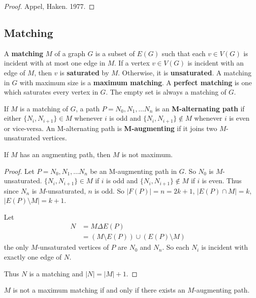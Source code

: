 \documentclass[12pt]{article}
\begin{document}
\begin{proof}
Appel, Haken. 1977.
\end{proof}

\subsection{Matching}
A {\bf matching} $M$ of a graph $G$ is a subset of $E(G)$ such that each $v\in V(G)$ is incident with at most one edge in $M$. If a vertex $v\in V(G)$ is incident with an edge of $M$, then $v$ is {\bf saturated} by $M$. Otherwise, it is {\bf unsaturated}. A matching in $G$ with maximum size is a {\bf maximum matching}. A {\bf perfect matching} is one which saturates every vertex in $G$. The empty set is always a matching of $G$.

If $M$ is a matching of $G$, a path $P = N_0, N_1, \dots N_n$ is an {\bf M-alternating path} if either $\{ N_i, N_{i+1} \} \in M$ whenever $i$ is odd and $\{ N_i, N_{i+1} \} \notin M$ whenever $i$ is even or vice-versa. An M-alternating path is {\bf M-augmenting} if it joins two $M$-unsaturated vertices.

\begin{lemma}
\label{augmentingIsNotMaximum}
If $M$ has an augmenting path, then $M$ is not maximum.
\end{lemma}

\begin{proof}
Let $P = N_0, N_1, \dots N_n$ be an M-augmenting path in $G$. So $N_0$ is $M$-unsaturated. $\{ N_i, N_{i+1} \} \in M$ if $i$ is odd and $\{ N_i, N_{i+1} \} \notin M$ if $i$ is even. Thus since $N_n$ is $M$-unsaturated, $n$ is odd. So $|F(P)| = n = 2k + 1$, $|E(P) \cap M| = k$, $|E(P) \setminus M| = k + 1$.

Let
\begin{align*}
N &= M \Delta E(P)\\
&= (M \setminus E(P)) \cup (E(P) \setminus M)
\end{align*}
the only $M$-unsaturated vertices of $P$ are $N_0$ and $N_n$. So each $N_i$ is incident with exactly one edge of $N$.

Thus $N$ is a matching and $|N| = |M| + 1$.
\end{proof}

\begin{lemma}
$M$ is not a maximum matching if and only if there exists an $M$-augmenting path.
\end{lemma}
\end{document}
